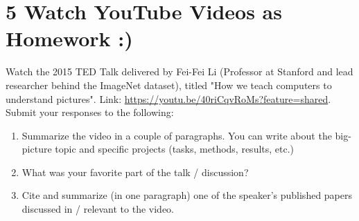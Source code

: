 \documentclass[11pt]{article}
\theoremstyle{plain}
\begin{document}
\section*{5 Watch YouTube Videos as Homework :)   }

Watch the 2015 TED Talk delivered by Fei-Fei Li (Professor at Stanford and lead researcher behind the ImageNet dataset), titled "How we teach computers to understand pictures".  Link: \url{https://youtu.be/40riCqvRoMs?feature=shared}.  \\
Submit your responses to the following:
\begin{enumerate}
	\item Summarize the video in a couple of paragraphs. You can write about the big-picture topic and specific projects (tasks, methods, results, etc.)
	\item What was your favorite part of the talk / discussion?
	\item Cite and summarize (in one paragraph) one of the speaker's published papers discussed in /  relevant to the video.
\end{enumerate}
\end{document}
